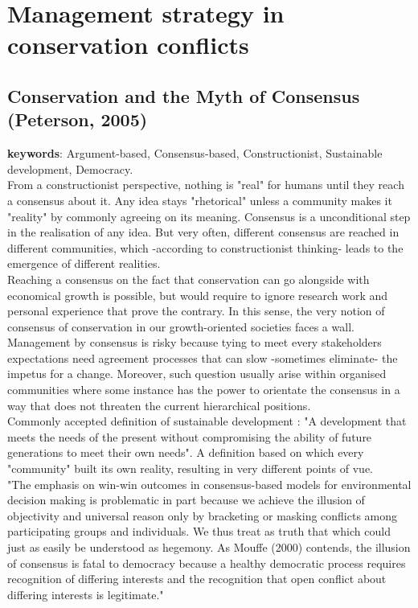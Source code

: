 \documentclass[12pt]{article}
\begin{document}
\section{Management strategy in conservation conflicts}

\subsection{Conservation and the Myth of Consensus (Peterson, 2005)}
\textbf{keywords}: Argument-based, Consensus-based, Constructionist, Sustainable development, Democracy.\\

From a constructionist perspective, nothing is "real" for humans until they reach a consensus about it.
Any idea stays "rhetorical" unless a community makes it "reality" by commonly agreeing on its meaning.
Consensus is a unconditional step in the realisation of any idea.
But very often, different consensus are reached in different communities, which -according to constructionist thinking- leads to the emergence of different realities.\\
Reaching a consensus on the fact that conservation can go alongside with economical growth is possible, but would require to ignore research work and personal experience that prove the contrary. In this sense, the very notion of consensus of conservation in our growth-oriented societies faces a wall.\\
Management by consensus is risky because tying to meet every stakeholders expectations need agreement processes that can slow -sometimes eliminate- the impetus for a change. Moreover, such question usually arise within organised communities where some instance has the power to orientate the consensus in a way that does not threaten the current hierarchical positions.\\
Commonly accepted definition of sustainable development : "A development that meets the needs of the present without compromising the ability of future generations to meet their own needs".
A definition based on which every "community" built its own reality, resulting in very different points of vue.\\
"The emphasis on win-win outcomes in consensus-based models for environmental decision making is problematic in part because we achieve the illusion of objectivity and universal reason only by bracketing or masking conflicts among participating groups and individuals. We thus treat as truth that which could just as easily be understood as hegemony. As Mouffe (2000) contends, the illusion of consensus is fatal to democracy because a healthy democratic process requires recognition of differing interests and the recognition that open conflict about differing interests is legitimate."
\end{document}
